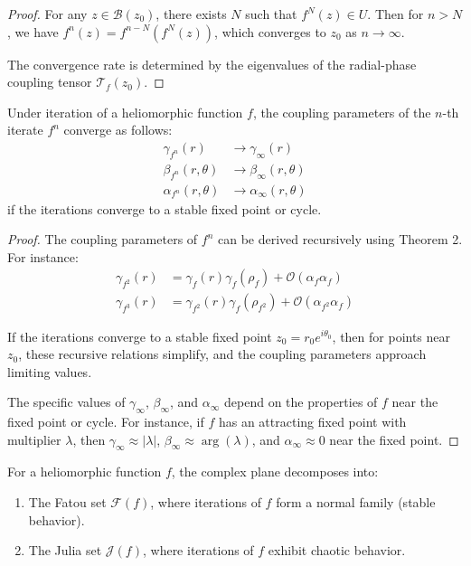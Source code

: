\begin{definition}
\begin{enumerate}
\begin{definition}
\begin{definition}
\begin{proof}
For any $z \in \mathcal{B}(z_0)$, there exists $N$ such that $f^N(z) \in U$. Then for $n > N$, we have $f^n(z) = f^{n-N}(f^N(z))$, which converges to $z_0$ as $n \to \infty$.

The convergence rate is determined by the eigenvalues of the radial-phase coupling tensor $\mathcal{T}_f(z_0)$.
\end{proof}

\begin{theorem}
Under iteration of a heliomorphic function $f$, the coupling parameters of the $n$-th iterate $f^n$ converge as follows:
\begin{align}
\gamma_{f^n}(r) &\to \gamma_{\infty}(r)\\
\beta_{f^n}(r,\theta) &\to \beta_{\infty}(r,\theta)\\
\alpha_{f^n}(r,\theta) &\to \alpha_{\infty}(r,\theta)
\end{align}
if the iterations converge to a stable fixed point or cycle.
\end{theorem}

\begin{proof}
The coupling parameters of $f^n$ can be derived recursively using Theorem 2. For instance:
\begin{align}
\gamma_{f^2}(r) &= \gamma_f(r)\gamma_f(\rho_f) + \mathcal{O}(\alpha_f\alpha_f)\\
\gamma_{f^3}(r) &= \gamma_{f^2}(r)\gamma_f(\rho_{f^2}) + \mathcal{O}(\alpha_{f^2}\alpha_f)
\end{align}

If the iterations converge to a stable fixed point $z_0 = r_0e^{i\theta_0}$, then for points near $z_0$, these recursive relations simplify, and the coupling parameters approach limiting values.

The specific values of $\gamma_{\infty}$, $\beta_{\infty}$, and $\alpha_{\infty}$ depend on the properties of $f$ near the fixed point or cycle. For instance, if $f$ has an attracting fixed point with multiplier $\lambda$, then $\gamma_{\infty} \approx |\lambda|$, $\beta_{\infty} \approx \arg(\lambda)$, and $\alpha_{\infty} \approx 0$ near the fixed point.
\end{proof}

\begin{theorem}
For a heliomorphic function $f$, the complex plane decomposes into:
\begin{enumerate}
    \item The Fatou set $\mathcal{F}(f)$, where iterations of $f$ form a normal family (stable behavior).
    \item The Julia set $\mathcal{J}(f)$, where iterations of $f$ exhibit chaotic behavior.
\end{enumerate}
\end{theorem}


\end{definition}
\end{definition}
\end{enumerate}
\end{definition}

